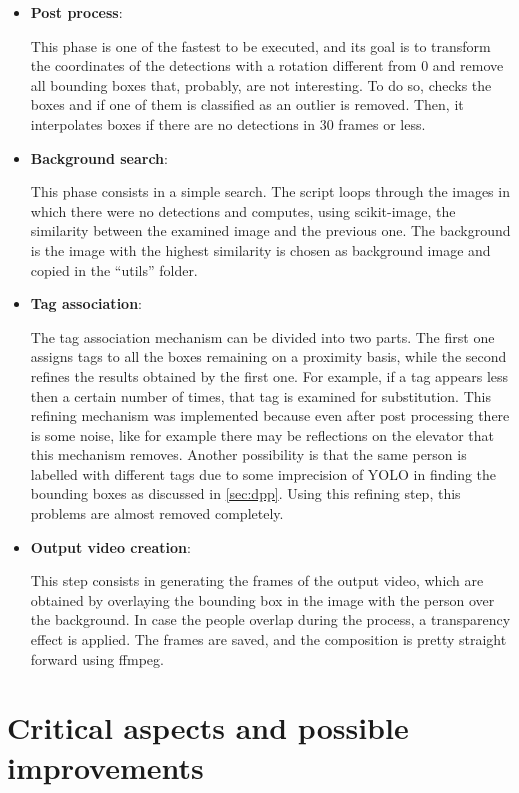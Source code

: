 \documentclass[conference]{IEEEtran}
\begin{document}
\begin{itemize}
			\item \textbf{Post process}:
			
				This phase is one of the fastest to be executed, and its goal is to transform the coordinates of the detections with a rotation different from 
				0 and remove all bounding boxes that, probably, are not interesting. To do so, checks the boxes and if one of them is classified as an outlier 
				is removed. Then, it interpolates boxes if there are no detections in 30 frames or less.
			
			\item \textbf{Background search}:
			
				This phase consists in a simple search. The script loops through the images in which there were no detections and computes, using scikit-image,
				the similarity between the examined image and the previous one. The background is the image with the highest similarity is chosen as background 
				image and copied in the ``utils'' folder.
			
			\item \textbf{Tag association}:
				
				The tag association mechanism can be divided into two parts. The first one assigns tags to all the boxes remaining on a proximity basis, while 
				the second refines the results obtained by the first one. For example, if a tag appears less then a certain number of times, that tag is 
				examined for substitution. This refining mechanism was implemented because even after post processing there is some noise, like for example there 
				may be reflections on the elevator that this mechanism removes. Another possibility is that the same person is labelled with different tags due to 
				some imprecision of YOLO in finding the bounding boxes as discussed in \ref{sec:dpp}. Using this refining step, this problems are almost removed 
				completely. 
			
			\item \textbf{Output video creation}:
			
				This step consists in generating the frames of the output video, which are obtained by overlaying the bounding box in the image with the person 
				over the background. In case the people overlap during the process, a transparency effect is applied. The frames are saved, and the composition is 
				pretty straight forward using ffmpeg.
			
			
		\end{itemize}

	\section{Critical aspects and possible improvements}
	
\end{document}
